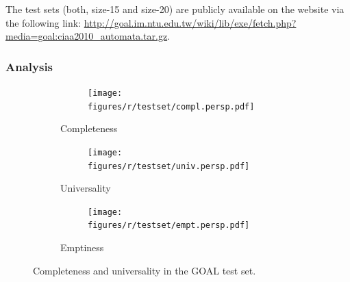The \goal{} test sets (both, size-15 and size-20) are publicly available on the \goal{} website via the following link: \url{http://goal.im.ntu.edu.tw/wiki/lib/exe/fetch.php?media=goal:ciaa2010_automata.tar.gz}.

\subsubsection{Analysis}

\renewcommand{\tabcolsep}{0.05cm}
\renewcommand{\arraystretch}{1.05}
\begin{figure}[htb!]
  \centering
  \begin{subfigure}{\textwidth}
    \begin{subtable}{0.47\textwidth}
    
    \end{subtable}
    \hfill
    \begin{subfigure}{0.52\textwidth}
    \texttt{[image: figures/r/testset/compl.persp.pdf]}
    \end{subfigure}
  \caption{Completeness}
  \end{subfigure}

 \begin{subfigure}{\textwidth}
    \begin{subtable}{0.47\textwidth}
    
    \end{subtable}
    \hfill
    \begin{subfigure}{0.52\textwidth}
    \texttt{[image: figures/r/testset/univ.persp.pdf]}
    \end{subfigure}
  \caption{Universality}
  \end{subfigure}

  \begin{subfigure}{\textwidth}
    \begin{subtable}{0.47\textwidth}
    
    \end{subtable}
    \hfill
    \begin{subfigure}{0.52\textwidth}
    \texttt{[image: figures/r/testset/empt.persp.pdf]}
    \end{subfigure}
  \caption{Emptiness}
  \end{subfigure}
\caption{Completeness and universality in the GOAL test set.}
\label{4_testset_analysis}
\end{figure}
\tablestyle  %

